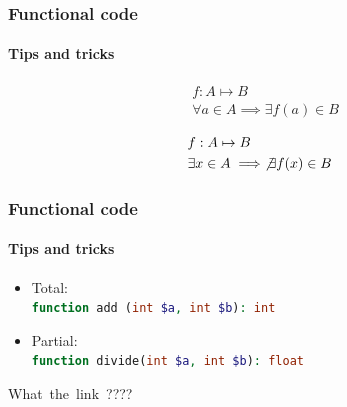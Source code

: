 \begin{frame}
    \frametitle{Functional code}
    \framesubtitle{Tips and tricks}

    \begin{definition}
        \begin{align*}
        & f: A \mapsto B\\
        & \forall a \in A \implies \exists f(a) \in B
        \end{align*}
    \end{definition}

    \begin{definition}
        \begin{align*}
        & f: A \mapsto B\\
        & \exists x \in A \implies \not\exists f(x) \in B
        \end{align*}
    \end{definition}
\end{frame}

\begin{frame}
    \frametitle{Functional code}
    \framesubtitle{Tips and tricks}

    \begin{itemize}
        \item Total:\pause
        \\\lstinline[language=PHP]!function add (int $a, int $b): int!
        \pause
        \item Partial:\pause
        \\\lstinline[language=PHP]!function divide(int $a, int $b): float!
    \end{itemize}
\end{frame}

\begin{frame}
    \Huge
    \begin{center}
        What\pause\ the\pause\ link\pause\ ????
    \end{center}

\end{frame}

